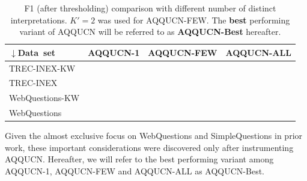 \documentclass{svjour3}
\begin{document}
\begin{table}[th]
\centering
\begin{tabular}{|l|c|c|c|} \hline
$\downarrow$Data~set & AQQUCN-1 & AQQUCN-FEW & AQQUCN-ALL \\
\hline
TREC-INEX-KW 
& \cellcolor{red!8}{0.264}
& \cellcolor{yellow!10}{0.388}
& \cellcolor{green!24}{0.417} \\
TREC-INEX
& \cellcolor{red!8}{0.269}
& \cellcolor{yellow!10}{0.285}
& \cellcolor{green!24}{0.323} \\ \hline
WebQuestions-KW
& \cellcolor{green!24}{0.492}
& \cellcolor{yellow!5}{0.437}
& \cellcolor{red!4}{0.392} \\
WebQuestions
& \cellcolor{green!24}{0.532}
& \cellcolor{yellow!5}{0.512}
& \cellcolor{red!4}{0.497} \\ \hline
\end{tabular}
\caption{F1 (after thresholding) comparison with different number of distinct interpretations.   $K'=2$ was used for AQQUCN-FEW.  The {\bf best} performing variant of AQQUCN will be referred to as {\bf AQQUCN-Best} hereafter.}
\label{fig:AQQUCNcomparisonF1}
\end{table}


Given the almost exclusive focus on WebQuestions and SimpleQuestions in prior work, these important considerations were discovered only after instrumenting AQQUCN.  Hereafter, we will refer to the best performing variant among AQQUCN-1, AQQUCN-FEW and AQQUCN-ALL as AQQUCN-Best. 
\end{document}
